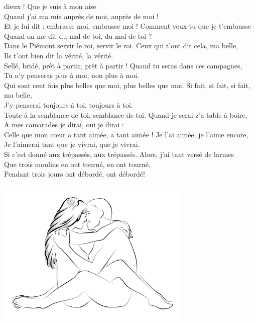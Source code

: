 
 dieux ! Que je suis à mon aise
\\Quand j’ai ma mie auprès de moi, auprès de moi !
\\
{Et je lui dit : embrasse moi, embrasse moi !}
Comment veux-tu que je t’embrasse
\\Quand on me dit du mal de toi, du mal de toi ?
\\
{Dans le Piémont servir le roi, servir le roi.}
Ceux qui t’ont dit cela, ma belle,
\\Ils t’ont bien dit la vérité, la vérité.
\\
{Sellé, bridé, prêt à partir, prêt à partir !}
Quand tu seras dans ces campagnes,
\\Tu n’y penseras plus à moi, non plus à moi.
\\
{Qui sont cent fois plus belles que moi, plus belles que moi.}
Si fait, si fait, si fait, ma belle,
\\J’y penserai toujours à toi, toujours à toi.
\\
{Toute à la semblance de toi, semblance de toi.}
Quand je serai z’a table à boire,
\\A mes camarades je dirai, oui je dirai :
\\
{Celle que mon cœur a tant aimée, a tant aimée !}
Je l’ai aimée, je l’aime encore,
\\Je l’aimerai tant que je vivrai, que je vivrai.
\\
{Si c’est donné aux trépassés, aux trépassés.}
Alors, j'ai tant versé de larmes
\\Que trois moulins en ont tourné, en ont tourné.
\\
{Pendant trois jours ont débordé, ont débordé!}
\bigskip
\begin{center}
\includegraphics[width=0.7\textwidth]{images/brev72.png}
\end{center}

\breakpage
